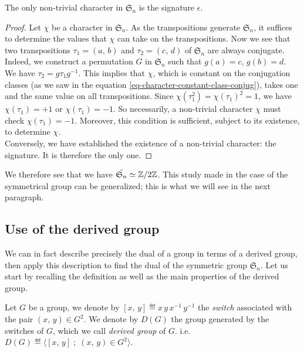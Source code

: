 \begin{prop}
The only non-trivial character in $\mathfrak{S}_n $ is the signature $\epsilon $.
\end{prop}
\begin{proof}
Let $\chi$ be a character in $\mathfrak{S}_n $. As the transpositions generate $\mathfrak{S}_n $, it suffices to determine the values that $\chi$ can take on the transpositions. Now we see that two transpositions $\tau_1 = (a, \, b)$ and $\tau_2 = (c, \, d)$ of $\mathfrak{S}_n $ are always conjugate. Indeed, we construct a permutation $G$ in $\mathfrak{S}_n $ such that $ g (a) = c $, $ g (b) = d $. \\We have $\tau_2 = g \tau_1 g^{-1}$. This implies that $\chi$, which is constant on the conjugation classes (as we saw in the equation \eqref{eq-character-constant-class-conjug}), takes one and the same value on all transpositions. Since $\chi(\tau_1^2) = \chi(\tau_1)^2 = 1$, we have $\chi(\tau_1) = + 1$ or $\chi(\tau_1) = -1$. So necessarily, a non-trivial character $\chi$ must check $\chi(\tau_1) = -1$. Moreover, this condition is sufficient, subject to its existence, to determine $\chi$. \\Conversely, we have established the existence of a non-trivial character: the signature. It is therefore the only one.
\end{proof}
We therefore see that we have $\hat{\mathfrak{S}_n} \simeq \mathbb{Z}/2 \mathbb{Z}$. This study made in the case of the symmetrical group can be generalized; this is what we will see in the next paragraph.
\subsection{Use of the derived group}


We can in fact describe precisely the dual of a group in terms of a derived group, then apply this description to find the dual of the symmetric group $\mathfrak{S}_n $. Let us start by recalling the definition as well as the main properties of the derived group.

\begin{defn}
   \label{notation-18} \label{notation-19} Let $G$ be a group, we denote by $[x, \, y] \eqdef x \, y \, x^{-1} \, y^{-1}$ the \textit{switch} associated with the pair $ (x, \, y) \in G^2 $. We denote by $ D(G)$ the group generated by the switches of $G$, which we call \textit{derived group} of $G$. i.e. $ D(G) \eqdef \langle [x, \, y] \; ; \; (x, \, y) \in G^2 \rangle $.
\end{defn}


